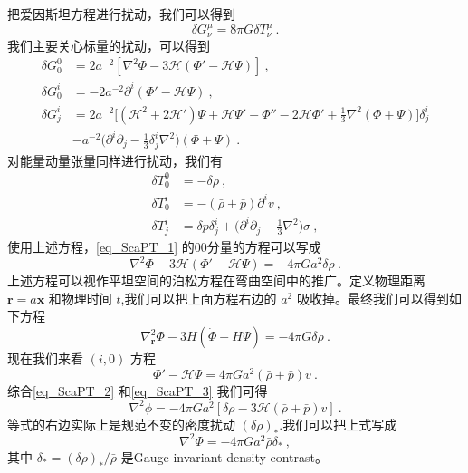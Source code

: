 
\begin{issues}
\issueNeedCite
\issueMissDepend
\end{issues}

把爱因斯坦方程进行扰动，我们可以得到
\begin{equation}\label{eq_ScaPT_1}
\delta G^\mu_\nu = 8 \pi G\delta T^\mu_\nu ~.
\end{equation}
我们主要关心标量的扰动，可以得到
\begin{equation}
\begin{aligned}
\delta G^0_0 & = 2 a^{-2} [\nabla^2 \Phi- 3 \mathcal H(\Phi' - \mathcal H \Psi)] ~,  \\
\delta G^i_0 & = - 2 a^{-2} \partial^i(\Phi' - \mathcal H \Psi)~, \\
\delta G^i_j &= 2 a^{-2} \bigg[ (\mathcal H^2 + 2 \mathcal H')\Psi +\mathcal H \Psi' - \Phi'' - 2 \mathcal H \Phi' + \frac{1}{3} \nabla^2 (\Phi+\Psi)  \bigg] \delta^i_j \\
& - a^{-2} \bigg( \partial^i\partial_j - \frac{1}{3} \delta^i_j \nabla^2 \bigg) (\Phi+\Psi) ~.
\end{aligned}
\end{equation}
对能量动量张量同样进行扰动，我们有
\begin{equation}
\begin{aligned}
\delta T^0_0 & = - \delta \rho~, \\
\delta T^i_0 & = - (\bar \rho +\bar p) \partial^i v~, \\
\delta T^i_j & = \delta p \delta^i_j + \bigg( \partial^i\partial_j - \frac{1}{3} \nabla^2 \bigg) \sigma ~,
\end{aligned}
\end{equation}
使用上述方程，\autoref{eq_ScaPT_1} 的00分量的方程可以写成
\begin{equation}\label{eq_ScaPT_2}
\nabla^2 \Phi - 3 \mathcal H (\Phi' - \mathcal H\Psi) = - 4 \pi G a^2 \delta \rho~. 
\end{equation}
上述方程可以视作平坦空间的泊松方程在弯曲空间中的推广。定义物理距离 $\mathbf r = a \mathbf x$ 和物理时间 $t$,我们可以把上面方程右边的 $a^2$ 吸收掉。最终我们可以得到如下方程
\begin{equation}
\nabla^2_{\mathbf r} \Phi - 3 H (\dot\Phi - H \Psi) = - 4 \pi G \delta \rho~.
\end{equation}
现在我们来看 $(i,0)$ 方程
\begin{equation}\label{eq_ScaPT_3}
\Phi' - \mathcal H \Psi = 4 \pi G a^2 (\bar \rho + \bar p) v ~.
\end{equation}
综合\autoref{eq_ScaPT_2} 和\autoref{eq_ScaPT_3} 我们可得
\begin{equation}
\nabla^2\phi = - 4 \pi G a^2 [\delta \rho - 3 \mathcal H(\bar\rho+ \bar p) v]~.
\end{equation}
等式的右边实际上是规范不变的密度扰动 $(\delta\rho)_*$.我们可以把上式写成
\begin{equation}
\nabla^2\Phi = - 4 \pi G a^2 \bar \rho \delta_* ~,
\end{equation}
其中 $\delta_* = (\delta \rho)_*/\bar \rho$ 是Gauge-invariant density contrast。

